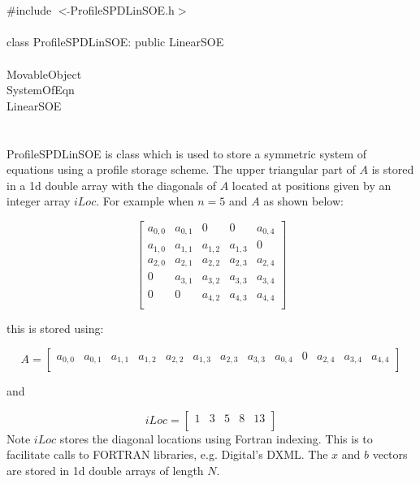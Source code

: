 
 \\

   \\
\indent \#include $<\tilde{ }$ProfileSPDLinSOE.h$>$  \\

  \\
\indent class ProfileSPDLinSOE: public LinearSOE \\

 \\
\indent MovableObject \\
\indent\indent SystemOfEqn \\
\indent\indent\indent LinearSOE \\
\indent\indent\indent{} \\

  \\
\indent ProfileSPDLinSOE is class which is used to store a symmetric
system of equations using a profile storage scheme. The upper
triangular part of $A$ is stored in a 1d double array with the diagonals of
$A$ located at positions given by an integer array $iLoc$. 
For example when $n=5$ and $A$ as shown below:

$$
\left[
\begin{array}{ccccc}
a_{0,0} & a_{0,1}  & 0 & 0 & a_{0,4} \\
a_{1,0} & a_{1,1} & a_{1,2} & a_{1,3} & 0 \\
a_{2,0} & a_{2,1} & a_{2,2} & a_{2,3} & a_{2,4}  \\
0 & a_{3,1} & a_{3,2} & a_{3,3} & a_{3,4} \\
0 & 0 & a_{4,2} & a_{4,3} & a_{4,4} \\
\end{array}
\right] 
$$

this is stored using:


$$ A =
\left[
\begin{array}{cccccccccccccccccccc}
a_{0,0} & a_{0,1}  & a_{1,1} & a_{1,2} & a_{2,2} & a_{1,3} &
a_{2,3} & a_{3,3} & a_{0,4} & 0 & a_{2,4} & a_{3,4} & a_{4,4}\\
\end{array}
\right] 
$$

and 

$$ iLoc =
\left[
\begin{array}{cccccccccccccccccccc}
1 & 3 & 5 & 8 & 13 \\
\end{array}
\right] 
$$
Note $iLoc$ stores the diagonal locations using Fortran indexing. This
is to facilitate calls to FORTRAN libraries, e.g. Digital's DXML.
The $x$ and $b$ vectors are stored in 1d double arrays of length $N$. \\


